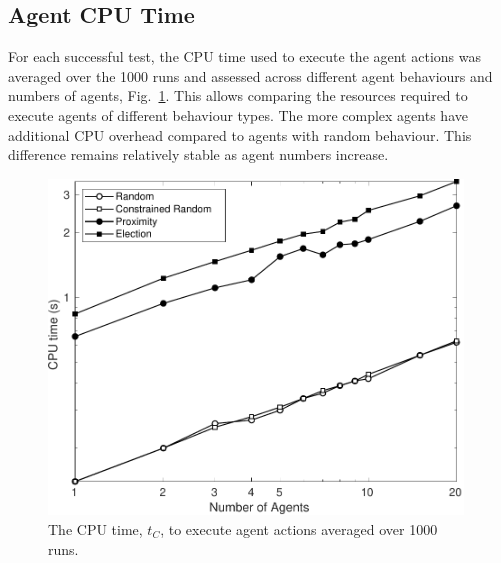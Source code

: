 \documentclass[runningheads,a4paper]{llncs}
\begin{document}
\subsection{Agent CPU Time}
For each successful test, the CPU time used to execute the agent actions was averaged over the 1000 runs and assessed across different agent behaviours and numbers of agents, Fig.~\ref{f:cputime}. This allows comparing the resources required to execute agents of different behaviour types. The more complex agents have additional CPU overhead compared to agents with random behaviour. This difference remains relatively stable as agent numbers increase.

\begin{figure}[!t]
	\centering
\includegraphics[width=0.98\textwidth]{TimeCPU.pdf}
	\caption{The CPU time, $t_{C}$, to execute agent actions averaged over 1000 runs.}
	\label{f:cputime}
\end{figure}
\end{document}
